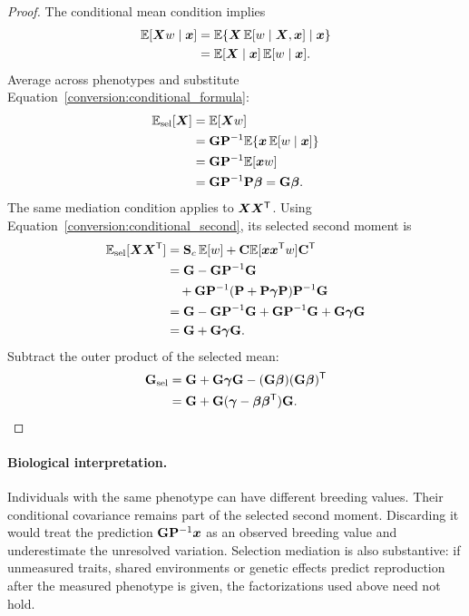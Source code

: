 \begin{proof}
The conditional mean condition implies
\begin{align*}
 \mathbb E[\boldsymbol{X}w\mid\boldsymbol{x}]
 &=\mathbb E\{\boldsymbol{X}\,\mathbb E[w\mid\boldsymbol{X},\boldsymbol{x}]\mid\boldsymbol{x}\}\\
 &=\mathbb E[\boldsymbol{X}\mid\boldsymbol{x}]\,\mathbb E[w\mid\boldsymbol{x}].
\end{align*}
Average across phenotypes and substitute
Equation~\eqref{conversion:conditional_formula}:
\begin{align*}
 \mathbb E_{\rm sel}[\boldsymbol{X}]
 &=\mathbb E[\boldsymbol{X}w]\\
 &=\mathbf{G}\mathbf{P}^{-1}
        \mathbb E\{\boldsymbol{x}\,\mathbb E[w\mid\boldsymbol{x}]\}\\
 &=\mathbf{G}\mathbf{P}^{-1}\mathbb E[\boldsymbol{x}w]\\
 &=\mathbf{G}\mathbf{P}^{-1}\mathbf{P}\boldsymbol{\beta}
 =\mathbf{G}\boldsymbol{\beta}.
\end{align*}
The same mediation condition applies to
\(\boldsymbol{X}\boldsymbol{X}^{\mathsf T}\). Using
Equation~\eqref{conversion:conditional_second}, its selected second moment
is
\begin{align*}
 \mathbb E_{\rm sel}[\boldsymbol{X}\boldsymbol{X}^{\mathsf T}]
 &=\mathbf{S}_c\,\mathbb E[w]
   +\mathbf{C}\mathbb E[\boldsymbol{x}\boldsymbol{x}^{\mathsf T}w]\mathbf{C}^{\mathsf T}\\
 &=\mathbf{G}-\mathbf{G}\mathbf{P}^{-1}\mathbf{G}\\
 &\quad+\mathbf{G}\mathbf{P}^{-1}
       (\mathbf{P}+\mathbf{P}\boldsymbol{\gamma}\mathbf{P})
       \mathbf{P}^{-1}\mathbf{G}\\
 &=\mathbf{G}-\mathbf{G}\mathbf{P}^{-1}\mathbf{G}
       +\mathbf{G}\mathbf{P}^{-1}\mathbf{G}+\mathbf{G}\boldsymbol{\gamma}\mathbf{G}\\
 &=\mathbf{G}+\mathbf{G}\boldsymbol{\gamma}\mathbf{G}.
\end{align*}
Subtract the outer product of the selected mean:
\begin{align*}
 \mathbf{G}_{\mathrm{sel}}
 &=\mathbf{G}+\mathbf{G}\boldsymbol{\gamma}\mathbf{G}
      -(\mathbf{G}\boldsymbol{\beta})(\mathbf{G}\boldsymbol{\beta})^{\mathsf T}\\
 &=\mathbf{G}+\mathbf{G}
       (\boldsymbol{\gamma}-\boldsymbol{\beta}\boldsymbol{\beta}^{\mathsf T})\mathbf{G}.
\end{align*}
\end{proof}

\paragraph{Biological interpretation.}
Individuals with the same phenotype can have different breeding values.
Their conditional covariance remains part of the selected second moment.
Discarding it would treat the prediction \(\mathbf{G}\mathbf{P}^{-1}\boldsymbol{x}\) as an
observed breeding value and underestimate the unresolved variation.
Selection mediation is also substantive: if unmeasured traits, shared
environments or genetic effects predict reproduction after the measured
phenotype is given, the factorizations used above need not hold.


